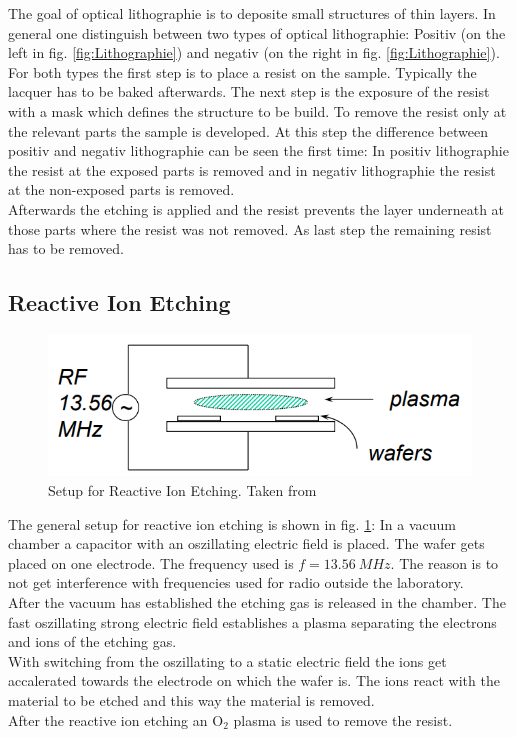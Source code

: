 \documentclass[%
 reprint,
amsmath,amssymb,
pra,
]{revtex4-1}
\begin{document}
The goal of optical lithographie is to deposite small structures of thin layers. In general one distinguish between two types of optical lithographie: Positiv (on the left in fig. \ref{fig:Lithographie}) and negativ (on the right in fig. \ref{fig:Lithographie}). \\
For both types the first step is to place a resist on the sample. Typically the lacquer has to be baked afterwards. The next step is the exposure of the resist with a mask which defines the structure to be build. To remove the resist only at the relevant parts the sample is developed. At this step the difference between positiv and negativ lithographie can be seen the first time: In positiv lithographie the resist at the exposed parts is removed and in negativ lithographie the resist at the non-exposed parts is removed. \\
Afterwards the etching is applied and the resist prevents the layer underneath at those parts where the resist was not removed. As last step the remaining resist has to be removed.


\subsection{Reactive Ion Etching}

\begin{figure}
\centering
\includegraphics[scale=0.5]{Bilder/Reactive_Ion_Etching.PNG}
\caption{Setup for Reactive Ion Etching. Taken from \cite{Cheung}}
\label{fig:Reactive_Ion_Etching}
\end{figure}

The general setup for reactive ion etching is shown in fig. \ref{fig:Reactive_Ion_Etching}: In a vacuum chamber a capacitor with an oszillating electric field is placed. The wafer gets placed on one electrode. The frequency used is $f = \SI{13.56}{MHz}$. The reason is to not get interference with frequencies used for radio outside the laboratory. \\
After the vacuum has established the etching gas is released in the chamber. The fast oszillating strong electric field establishes a plasma separating the electrons and ions of the etching gas. \\
With switching from the oszillating to a static electric field the ions get accalerated towards the electrode on which the wafer is. The ions react with the material to be etched and this way the material is removed. \\
After the reactive ion etching an O$_2$ plasma is used to remove the resist.
\end{document}
